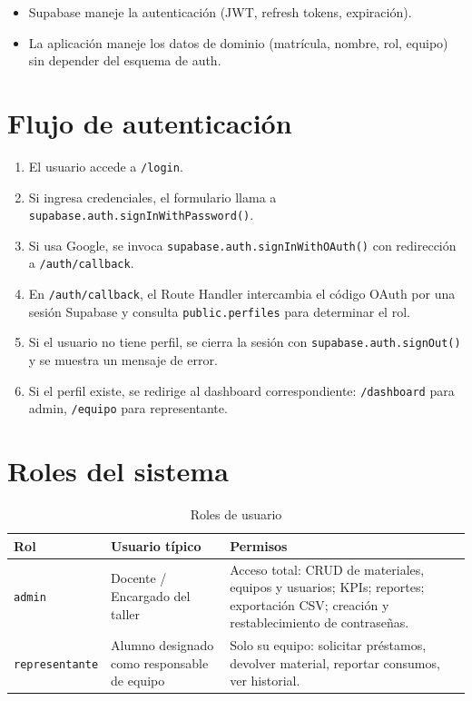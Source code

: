 \documentclass[12pt,a4paper,oneside]{report}
\newcommand{\file}[1]{\texttt{\color{cecyteDark}#1}}
\begin{document}
\begin{itemize}
  \item Supabase maneje la autenticación (JWT, refresh tokens, expiración).
  \item La aplicación maneje los datos de dominio (matrícula, nombre, rol, equipo) sin depender del esquema de auth.
\end{itemize}

\section{Flujo de autenticación}

\begin{enumerate}
  \item El usuario accede a \file{/login}.
  \item Si ingresa credenciales, el formulario llama a \file{supabase.auth.signInWithPassword()}.
  \item Si usa Google, se invoca \file{supabase.auth.signInWithOAuth()} con redirección a \file{/auth/callback}.
  \item En \file{/auth/callback}, el Route Handler intercambia el código OAuth por una sesión Supabase y consulta \file{public.perfiles} para determinar el rol.
  \item Si el usuario no tiene perfil, se cierra la sesión con \file{supabase.auth.signOut()} y se muestra un mensaje de error.
  \item Si el perfil existe, se redirige al dashboard correspondiente: \file{/dashboard} para admin, \file{/equipo} para representante.
\end{enumerate}

\section{Roles del sistema}

\begin{table}[H]
\centering
\caption{Roles de usuario}
\begin{tabular}{@{}L{3cm}L{3.5cm}L{8.5cm}@{}}
\toprule
{}
\textbf{Rol} & \textbf{Usuario típico} & \textbf{Permisos} \\
\midrule
\file{admin} & Docente / Encargado del taller &
  Acceso total: CRUD de materiales, equipos y usuarios; KPIs; reportes; exportación CSV; creación y restablecimiento de contraseñas. \\
\file{representante} & Alumno designado como responsable de equipo &
  Solo su equipo: solicitar préstamos, devolver material, reportar consumos, ver historial. \\
\bottomrule
\end{tabular}
\end{table}
\end{document}
